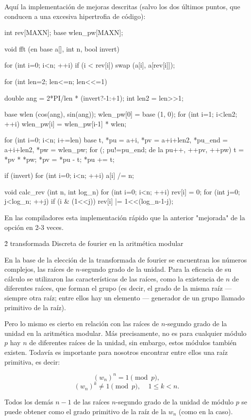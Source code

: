 Aquí la implementación de mejoras descritas (salvo los dos últimos puntos, que conducen a una excesiva hipertrofia de código):

\code
int rev[MAXN];
base wlen_pw[MAXN];

void fft (en base a[], int n, bool invert) {
for (int i=0; i<n; ++i)
if (i < rev[i])
swap (a[i], a[rev[i]]);

for (int len=2; len<=n; len<<=1) {
double ang = 2*PI/len * (invert?-1:+1);
int len2 = len>>1;

base wlen (cos(ang), sin(ang));
wlen_pw[0] = base (1, 0);
for (int i=1; i<len2; ++i)
wlen_pw[i] = wlen_pw[i-1] * wlen;

for (int i=0; i<n; i+=len) {
base t,
*pu = a+i,
*pv = a+i+len2, 
*pu_end = a+i+len2,
*pw = wlen_pw;
for (; pu!=pu_end; de la pu++, ++pv, ++pw) {
t = *pv * *pw;
*pv = *pu - t;
*pu += t;
}
}
}

if (invert)
for (int i=0; i<n; ++i)
a[i] /= n;
}

void calc_rev (int n, int log_n) {
for (int i=0; i<n; ++i) {
rev[i] = 0;
for (int j=0; j<log_n; ++j)
if (i & (1<<j))
rev[i] |= 1<<(log_n-1-j);
}
}
\endcode

En las compiladores esta implementación rápido que la anterior "mejorada" de la opción en 2-3 veces.


\h2{ transformada Discreta de fourier en la aritmética modular }

En la base de la elección de la transformada de fourier se encuentran los números complejos, las raíces de $n$-segundo grado de la unidad. Para la eficacia de su cálculo se utilizaron las características de las raíces, como la existencia de $n$ de diferentes raíces, que forman el grupo (es decir, el grado de la misma raíz --- siempre otra raíz; entre ellos hay un elemento --- generador de un grupo llamado primitivo de la raíz).

Pero lo mismo es cierto en relación con las raíces de $n$-segundo grado de la unidad en la aritmética modular. Más precisamente, no es para cualquier módulo $p$ hay $n$ de diferentes raíces de la unidad, sin embargo, estos módulos también existen. Todavía es importante para nosotros encontrar entre ellos una raíz primitiva, es decir:

$$ (w_n)^n = 1 \pmod p, $$
$$ (w_n)^k \ne 1 {\pmod p}, ~~~~~ 1 \le k < n. $$

Todos los demás $n-1$ de las raíces $n$-segundo grado de la unidad de módulo $p$ se puede obtener como el grado primitivo de la raíz de la $w_n$ (como en la caso).

